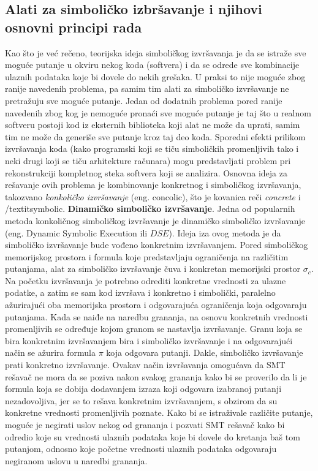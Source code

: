 \documentclass[12pt]{article}
\begin{document}
\subsection{Alati za simboličko izbršavanje i njihovi osnovni principi rada}
Kao što je već rečeno, teorijska ideja simboličkog izvršavanja je da se istraže sve moguće putanje u okviru nekog koda (softvera) i da se odrede sve kombinacije ulaznih podataka koje bi dovele do nekih grešaka. U praksi to nije moguće zbog ranije navedenih problema, pa samim tim alati za simboličko izvršavanje ne pretražuju sve moguće putanje. Jedan od dodatnih problema pored ranije navedenih zbog kog je nemoguće pronaći sve moguće putanje je taj što u realnom softveru postoji kod iz eksternih biblioteka koji alat ne može da uprati, samim tim ne može da generiše sve putanje kroz taj deo koda. Sporedni efekti prilikom izvršavanja koda (kako programski koji se tiču simboličkih promenljivih tako i neki drugi koji se tiču arhitekture računara) mogu predstavljati problem pri rekonstrukciji kompletnog steka softvera koji se analizira. Osnovna ideja za rešavanje ovih problema je kombinovanje konkretnog i simboličkog izvršavanja, takozvano \textit{konkoličko izvršavanje} (eng. concolic), što je kovanica reči \textit{concrete} i /textit{symbolic}.
\newline
\newline
\textbf{Dinamičko simboličko izvršavanje}. Jedna od popularnih metoda konkoličnog simboličkog izvršavanje je dinamičko simboličko izvršavanje (eng. Dynamic Symbolic Execution ili $DSE$). Ideja iza ovog metoda je da simboličko izvršavanje bude vođeno konkretnim izvršavanjem. Pored simboličkog memorijskog prostora i formula koje predstavljaju ograničenja na različitim putanjama, alat za simboličko izvršavanje čuva i konkretan memorijski prostor $\sigma_c$. Na početku izvršavanja je potrebno odrediti konkretne vrednosti za ulazne podatke, a zatim se sam kod izvršava i konkretno i simbolički, paralelno ažurirajući oba memorijska prostora i odgovarajuća ograničenja koja odgovaraju putanjama. Kada se naiđe na naredbu grananja, na osnovu konkretnih vrednosti promenljivih se određuje kojom granom se nastavlja izvršavanje. Granu koja se bira konkretnim izvršavanjem bira i simboličko izvršavanje i na odgovarajući način se ažurira formula $\pi$ koja odgovara putanji. Dakle, simboličko izvršavanje prati konkretno izvršavanje. Ovakav način izvršavanja omogućava da SMT rešavač ne mora da se poziva nakon svakog grananja kako bi se proverilo da li je formula koja se dobija dodavanjem izraza koji odgovara izabranoj putanji nezadovoljiva, jer se to rešava konkretnim izvršavanjem, s obzirom da su konkretne vrednosti promenljivih poznate. Kako bi se istraživale različite putanje, moguće je negirati uslov nekog od grananja i pozvati SMT rešavač kako bi odredio koje su vrednosti ulaznih podataka koje bi dovele do kretanja baš tom putanjom, odnosno koje početne vrednosti ulaznih podataka odgovaraju negiranom uslovu u naredbi grananja. 
\end{document}

